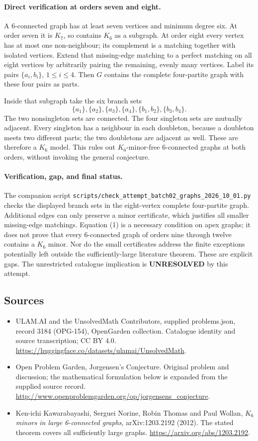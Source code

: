 \documentclass[11pt,a4paper]{article}
\begin{document}
\paragraph{Direct verification at orders seven and eight.}
A 6-connected graph has at least seven vertices and minimum degree six. At order seven it is $K_7$, so contains $K_6$ as a subgraph. At order eight every vertex has at most one non-neighbour; its complement is a matching together with isolated vertices. Extend that missing-edge matching to a perfect matching on all eight vertices by arbitrarily pairing the remaining, evenly many vertices. Label its pairs $\{a_i,b_i\}$, $1\le i\le4$. Then $G$ contains the complete four-partite graph with these four pairs as parts.

Inside that subgraph take the six branch sets
\[
 \{a_1\},\{a_2\},\{a_3\},\{a_4\},
 \{b_1,b_2\},\{b_3,b_4\}.
\]
The two nonsingleton sets are connected. The four singleton sets are mutually adjacent. Every singleton has a neighbour in each doubleton, because a doubleton meets two different parts; the two doubletons are adjacent as well. These are therefore a $K_6$ model. This rules out $K_6$-minor-free 6-connected graphs at both orders, without invoking the general conjecture.

\paragraph{Verification, gap, and final status.}
The companion script \texttt{scripts/check\_attempt\_batch02\_graphs\_2026\_10\_01.py} checks the displayed branch sets in the eight-vertex complete four-partite graph. Additional edges can only preserve a minor certificate, which justifies all smaller missing-edge matchings. Equation (1) is a necessary condition on apex graphs; it does not prove that every 6-connected graph of orders nine through twelve contains a $K_6$ minor. Nor do the small certificates address the finite exceptions potentially left outside the sufficiently-large literature theorem. These are explicit gaps. The unrestricted catalogue implication is \textbf{UNRESOLVED} by this attempt.

\subsection{Sources}
\begin{itemize}
\item[S1] ULAM.AI and the UnsolvedMath Contributors, supplied problems.json, record 3184 (OPG-154), OpenGarden collection. Catalogue identity and source transcription; CC BY 4.0.
\url{https://huggingface.co/datasets/ulamai/UnsolvedMath}.
\item[S2] Open Problem Garden, Jorgensen's Conjecture. Original problem and discussion; the mathematical formulation below is expanded from the supplied source record.
\url{http://www.openproblemgarden.org/op/jorgensens_conjecture}.
\item[S3] Ken-ichi Kawarabayashi, Serguei Norine, Robin Thomas and Paul Wollan, \emph{$K_6$ minors in large 6-connected graphs}, arXiv:1203.2192 (2012). The stated theorem covers all sufficiently large graphs.
\url{https://arxiv.org/abs/1203.2192}.
\end{itemize}
\end{document}

